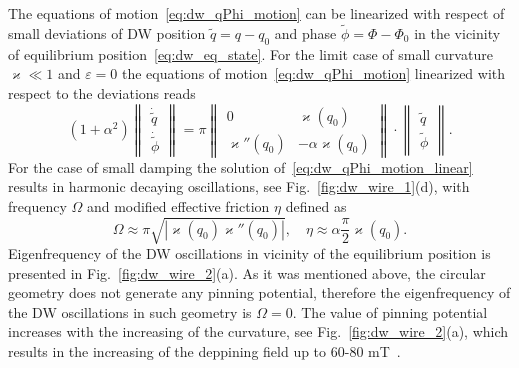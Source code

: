 The equations of motion~\eqref{eq:dw_qPhi_motion} can be linearized with respect of small deviations of DW position $\tilde{q}=q-q_0$ and phase $\tilde{\phi}=\Phi-\Phi_0$ in the vicinity of equilibrium position~\eqref{eq:dw_eq_state}. For the limit case of small curvature $\varkappa\ll1$ and $\varepsilon=0$ the equations of motion~\eqref{eq:dw_qPhi_motion} linearized with respect to the deviations reads~\cite{Yershov15b}
\begin{equation}\label{eq:dw_qPhi_motion_linear}
\left(1+\alpha^2\right)\left\|\begin{matrix}
\dot{\tilde{q}}\\
\dot{\tilde{\phi}}
\end{matrix}\right\|=\pi\left\|\begin{matrix}
0 & \varkappa(q_0)\\
\varkappa''(q_0)&-\alpha\varkappa(q_0)
\end{matrix}\right\|\cdot\left\|\begin{matrix}
\tilde{q}\\
\tilde{\phi}
\end{matrix}\right\|.
\end{equation}
For the case of small damping the solution of~\eqref{eq:dw_qPhi_motion_linear} results in harmonic decaying oscillations, see Fig.~\ref{fig:dw_wire_1}(d), with frequency $\Omega$ and modified effective friction $\eta$ defined as
\begin{equation}
\Omega \approx \pi\sqrt{|\varkappa(q_0)\varkappa''(q_0)|},\quad \eta\approx \alpha\frac{\pi}{2}\varkappa(q_0).
\end{equation}
Eigenfrequency of the DW oscillations in vicinity of the equilibrium position is presented in Fig.~\ref{fig:dw_wire_2}(a). As it was mentioned above, the circular geometry does not generate any pinning potential, therefore the eigenfrequency of the DW oscillations in such geometry is $\Omega=0$. The value of pinning potential increases with the increasing of the curvature, see Fig.~\ref{fig:dw_wire_2}(a), which results in the increasing of the deppining field up to 60-80 mT~\cite{Volkov19c,Lewis09}.

